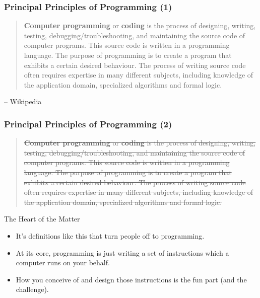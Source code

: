 \documentclass[10pt]{beamer}
\begin{document}
\begin{frame}
  \frametitle{Principal Principles of Programming (1)}
  \begin{quote}
    \textbf{Computer programming} or \textbf{coding} is the process of designing, writing, testing, debugging/troubleshooting, and maintaining the source code of computer programs. 
    This source code is written in a programming language. The purpose of programming is to create a program that exhibits a certain desired behaviour. 
    The process of writing source code often requires expertise in many different subjects, including knowledge of the application domain, specialized algorithms and formal logic.
  \end{quote}
  \begin{flushright}
    \footnotesize -- Wikipedia
  \end{flushright}
\end{frame}

\begin{frame}
  \frametitle{Principal Principles of Programming (2)}
  \begin{quote}
    \footnotesize
    \sout{
      \textbf{Computer programming} or \textbf{coding} is the process of designing, writing, testing, debugging/troubleshooting, and maintaining the source code of computer programs. 
      This source code is written in a programming language. The purpose of programming is to create a program that exhibits a certain desired behaviour. 
      The process of writing source code often requires expertise in many different subjects, including knowledge of the application domain, specialized algorithms and formal logic.
    }
  \end{quote}
  \normalsize
  \begin{block}{The Heart of the Matter}
    \begin{itemize}
      \item It's definitions like this that turn people off to programming.
      \item At its core, programming is just writing a set of instructions which a computer runs on your behalf.
      \item How you conceive of and design those instructions is the fun part (and the challenge).
    \end{itemize}
  \end{block}
\end{frame}
\end{document}
